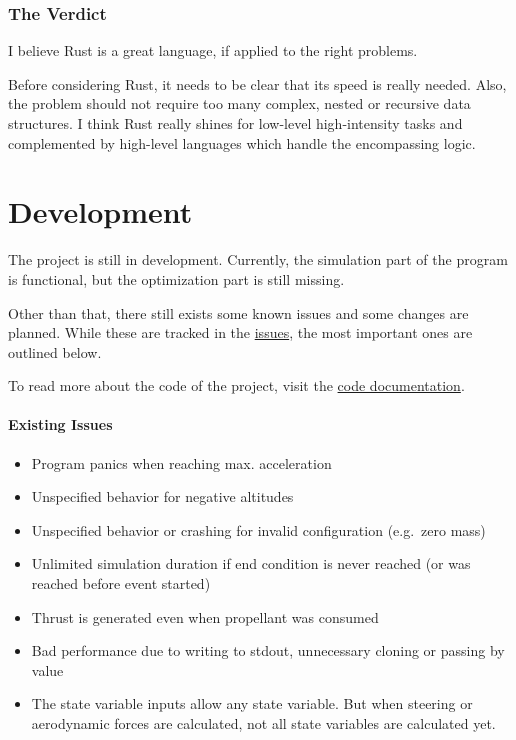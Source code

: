 \subsubsection{The Verdict}\label{the-verdict}

I believe Rust is a great language, if applied to the right problems.

Before considering Rust, it needs to be clear that its speed is really needed.
Also, the problem should not require too many complex, nested or recursive
data structures. I think Rust really shines for low-level high-intensity tasks
and complemented by high-level languages which handle the encompassing logic.

\section{Development}\label{development}

The project is still in development. Currently, the simulation part of the
program is functional, but the optimization part is still missing.

Other than that, there still exists some known issues and some changes are
planned. While these are tracked in the
\href{https://github.com/TiborVoelcker/post/issues}{issues}, the most important
ones are outlined below.

To read more about the code of the project, visit the
\href{https://tiborvoelcker.github.io/post/docs/post/index.html}{code documentation}.

\paragraph{Existing Issues}\label{existing-issues}

\begin{itemize}
  \item Program panics when reaching max. acceleration
  \item Unspecified behavior for negative altitudes
  \item Unspecified behavior or crashing for invalid configuration (e.g.~zero
        mass)
  \item Unlimited simulation duration if end condition is never reached (or was
        reached before event started)
  \item Thrust is generated even when propellant was consumed
  \item Bad performance due to writing to stdout, unnecessary cloning or passing
        by value
  \item The state variable inputs allow any state variable. But when steering or
        aerodynamic forces are calculated, not all state variables are calculated yet.
\end{itemize}

